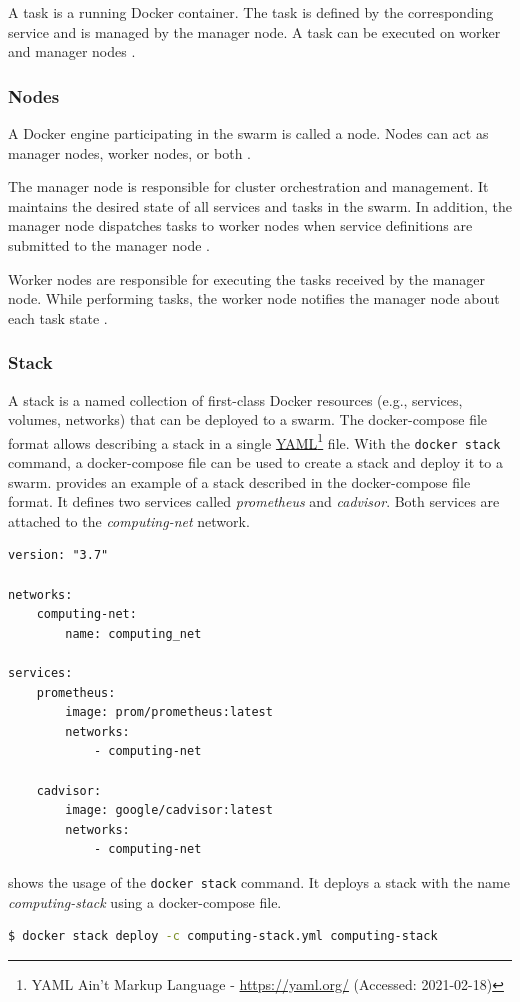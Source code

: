 A task is a running Docker container. The task is defined by the corresponding service and is managed by the manager node. A task can be executed on worker and manager nodes \cite{Docker2020Docs}.


\subsubsection{Nodes}
A Docker engine participating in the swarm is called a node.
Nodes can act as manager nodes, worker nodes, or both \cite{Docker2020Docs}.


The manager node is responsible for cluster orchestration and management. It maintains the desired state of all services and tasks in the swarm. In addition, the manager node dispatches tasks to worker nodes when service definitions are submitted to the manager node \cite{Docker2020Docs}.


Worker nodes are responsible for executing the tasks received by the manager node. While performing tasks, the worker node notifies the manager node about each task state \cite{Docker2020Docs}.


\subsubsection{Stack}
%
A stack is a named collection of first-class Docker resources (e.g., services, volumes, networks) that can be deployed to a swarm.
%
The docker-compose file format allows describing a stack in a single \hyperlink{abbr:yaml}{YAML}\footnote{YAML Ain't Markup Language - \url{https://yaml.org/} (Accessed: 2021-02-18)} file. With the \texttt{docker stack} command, a docker-compose file can be used to create a stack and deploy it to a swarm.
 provides an example of a stack described in the docker-compose file format.
It defines two services called \textit{prometheus} and \textit{cadvisor}. Both services are attached to the \textit{computing-net} network.
\begin{lstlisting}[label=lst:04_docker_swarm_stack_compose, caption=Basic example of stack describes in the docker-compose file format]
version: "3.7"

networks:
    computing-net:
        name: computing_net

services:
    prometheus:
        image: prom/prometheus:latest
        networks:
            - computing-net
            
    cadvisor:
        image: google/cadvisor:latest
        networks:
            - computing-net        
\end{lstlisting}
 shows the usage of the \texttt{docker stack} command. It deploys a stack with the name \textit{computing-stack} using a docker-compose file.
\begin{lstlisting}[label=lst:04_docker_swarm_stack_deploy, caption=Usage of the docker stack command to deploy a stack, language=bash, numbers=none]
$ docker stack deploy -c computing-stack.yml computing-stack     
\end{lstlisting}


